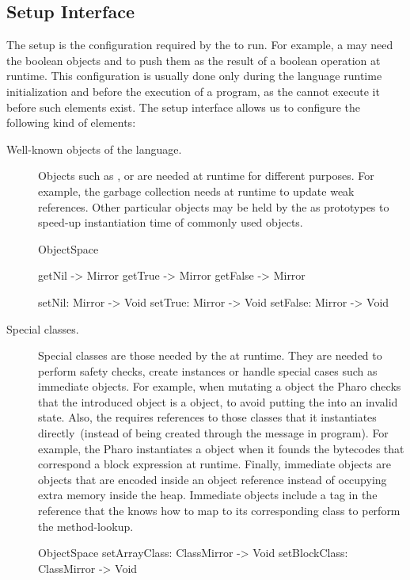 \subsection{\VM Setup Interface}

The \VM setup is the configuration required by the \VM to run.
For example, a \VM may need the boolean objects  and  to push them as the result of a boolean operation at runtime.
This configuration is usually done only during the language runtime initialization and before the execution of a program, as the \VM cannot execute it before such elements exist.
The \VM setup interface allows us to configure the following kind of elements:

\begin{description}
\item[Well-known objects of the language.] Objects such as ,  or  are needed at runtime for different purposes. For example, the garbage collection needs  at runtime to update weak references. Other particular objects may be held by the \VM as prototypes to speed-up instantiation time of commonly used objects.


\begin{code}
ObjectSpace {
    getNil -> Mirror
    getTrue -> Mirror
    getFalse -> Mirror

    setNil: Mirror -> Void
    setTrue: Mirror -> Void
    setFalse: Mirror -> Void
}
\end{code}

\item[Special classes.] Special classes are those needed by the \VM at runtime. They are needed to perform safety checks, create instances or handle special cases such as immediate objects. For example, when mutating a  object the Pharo \VM checks that the introduced object is a  object, to avoid putting the  into an invalid state. Also, the \VM requires references to those classes that it instantiates directly~(instead of being created through the  message in program). For example, the Pharo \VM instantiates a  object when it founds the bytecodes that correspond a block expression at runtime. Finally, immediate objects are objects that are encoded inside an object reference instead of occupying extra memory inside the heap. Immediate objects include a tag in the reference that the \VM knows how to map to its corresponding class to perform the method-lookup. 

\begin{code}
ObjectSpace {
    setArrayClass: ClassMirror -> Void
    setBlockClass: ClassMirror -> Void
}
\end{code}


\end{description}
